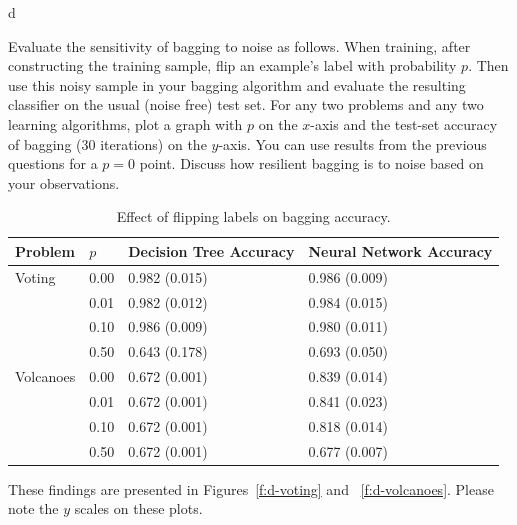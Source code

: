 \documentclass[fleqn]{homework}
\begin{document}
  \begin{problem}{d}
    \begin{question}
      Evaluate the sensitivity of bagging to noise as follows. When training,
      after constructing the training sample, flip an example’s label with
      probability $p$. Then use this noisy sample in your bagging algorithm and
      evaluate the resulting classifier on the usual (noise free) test set. For
      any two problems and any two learning algorithms, plot a graph with $p$ on
      the $x$-axis and the test-set accuracy of bagging (30 iterations) on the
      $y$-axis. You can use results from the previous questions for a $p=0$
      point. Discuss how resilient bagging is to noise based on your
      observations.
    \end{question}

    \begin{table}[h]
      \centering
      \caption{Effect of flipping labels on bagging accuracy.}
      \label{t:d}
      \begin{tabular}{ll|ll}
        \toprule
        Problem   & $p$        & Decision Tree Accuracy & Neural Network Accuracy \\
        \midrule
        Voting    & 0.00       & 0.982 (0.015)          & 0.986 (0.009)            \\
                  & 0.01       & 0.982 (0.012)          & 0.984 (0.015)            \\
                  & 0.10       & 0.986 (0.009)          & 0.980 (0.011)            \\
                  & 0.50       & 0.643 (0.178)          & 0.693 (0.050)            \\
        \midrule
        Volcanoes & 0.00       & 0.672 (0.001)          & 0.839 (0.014)            \\
                  & 0.01       & 0.672 (0.001)          & 0.841 (0.023)            \\
                  & 0.10       & 0.672 (0.001)          & 0.818 (0.014)            \\
                  & 0.50       & 0.672 (0.001)          & 0.677 (0.007)            \\
        \bottomrule
      \end{tabular}
    \end{table}

    These findings are presented in Figures~\ref{f:d-voting} and
    ~\ref{f:d-volcanoes}.  Please note the $y$ scales on these plots.


\end{problem}
\end{document}
